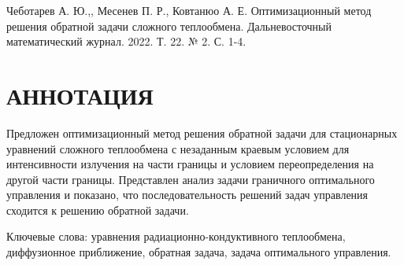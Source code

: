\documentclass[10pt]{article}
\begin{document}
Чеботарев А. Ю.,, Месенев П. Р., Ковтанюо А. Е. Оптимизационный метод решения обратной задачи сложного теплообмена. Дальневосточный математический журнал. 2022. Т. 22. № 2. С. 1-4.

\section{АННОТАЦИЯ}
Предложен оптимизационный метод решения обратной задачи для стационарных уравнений сложного теплообмена с незаданным краевым условием для интенсивности излучения на части границы и условием переопределения на другой части границы. Представлен анализ задачи граничного оптимального управления и показано, что последовательность решений задач управления сходится к решению обратной задачи.

Ключевые слова: уравнения радиационно-кондуктивного теплообмена, диффузионное приближение, обратная задача, задача оптимального управления.
\end{document}
